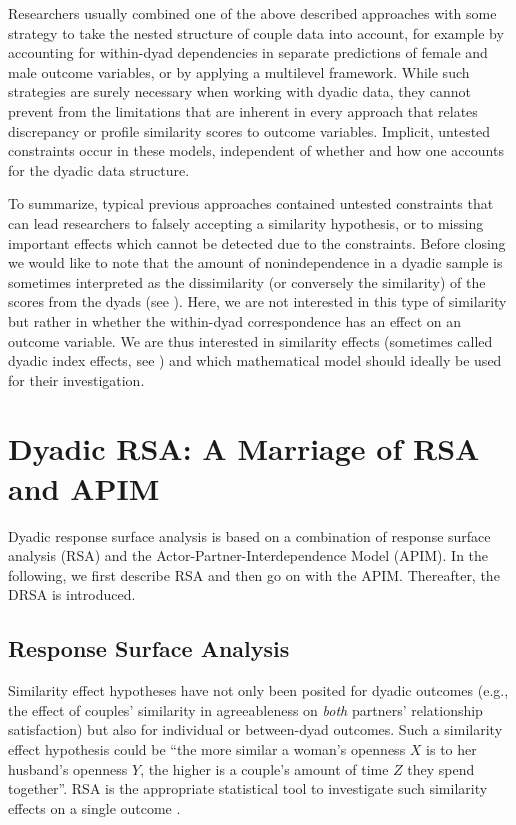 \documentclass[jou,a4paper,draftfirst]{apa6}
\begin{document}
Researchers usually combined one of the above described approaches with some strategy to take the nested structure of couple data into account, for example by accounting for within-dyad dependencies in separate predictions of female and male outcome variables, or by applying a multilevel framework. While such strategies are surely necessary when working with dyadic data, they cannot prevent from the limitations that are inherent in every approach that relates discrepancy or profile similarity scores to outcome variables. Implicit, untested constraints occur in these models, independent of whether and how one accounts for the dyadic data structure. 

To summarize, typical previous approaches contained untested constraints that can lead researchers to falsely accepting a similarity hypothesis, or to missing important effects which cannot be detected due to the constraints. Before closing we would like to note that the amount of nonindependence in a dyadic sample is sometimes interpreted as the dissimilarity (or conversely the similarity) of the scores from the dyads (see ). Here, we are not interested in this type of similarity but rather in whether the within-dyad correspondence has an effect on an outcome variable. We are thus interested in similarity effects (sometimes called dyadic index effects, see ) and which mathematical model should ideally be used for their investigation.


\section{Dyadic RSA: A Marriage of RSA and APIM}
Dyadic response surface analysis is based on a combination of response surface analysis (RSA) and the Actor-Partner-Interdependence Model (APIM). In the following, we first describe RSA and then go on with the APIM. Thereafter, the DRSA is introduced. 

\subsection{Response Surface Analysis}

Similarity effect hypotheses have not only been posited for dyadic outcomes (e.g., the effect of couples' similarity in agreeableness on \emph{both} partners' relationship satisfaction) but also for individual or between-dyad outcomes. Such a similarity effect hypothesis could be ``the more similar a woman's openness $X$ is to her husband's openness $Y$, the higher is a couple's amount of time $Z$ they spend together''. RSA is the appropriate statistical tool to investigate such similarity effects on a single outcome \parencite[e.g., see][]{edwards_alternatives_2002,edwards_relationship_2007,HumbergRSA, schonbrodt_testing_2015}. 
\end{document}
